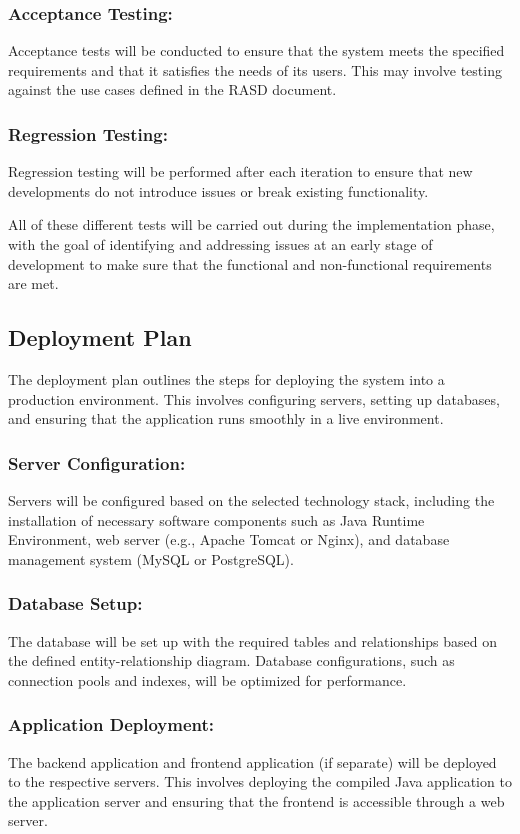 \documentclass{article}
\begin{document}
\subsubsection*{Acceptance Testing:}
Acceptance tests will be conducted to ensure that the system meets the specified requirements and that it satisfies the needs of its users. This may involve testing against the use cases defined in the RASD document.

\subsubsection*{Regression Testing:}
Regression testing will be performed after each iteration to ensure that new developments do not introduce issues or break existing functionality.

All of these different tests will be carried out during the implementation phase, with the goal of identifying and addressing issues at an early stage of development to make sure
that the functional and non-functional requirements are met.

\subsection{Deployment Plan}

The deployment plan outlines the steps for deploying the system into a production environment. This involves configuring servers, setting up databases, and ensuring that the application runs smoothly in a live environment.

\subsubsection*{Server Configuration:}
Servers will be configured based on the selected technology stack, including the installation of necessary software components such as Java Runtime Environment, web server (e.g., Apache Tomcat or Nginx), and database management system (MySQL or PostgreSQL).

\subsubsection*{Database Setup:}
The database will be set up with the required tables and relationships based on the defined entity-relationship diagram. Database configurations, such as connection pools and indexes, will be optimized for performance.

\subsubsection*{Application Deployment:}
The backend application and frontend application (if separate) will be deployed to the respective servers. This involves deploying the compiled Java application to the application server and ensuring that the frontend is accessible through a web server.
\end{document}
